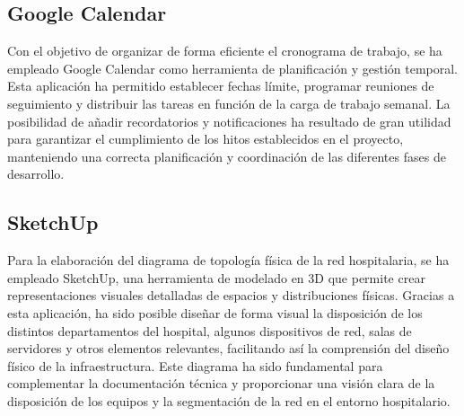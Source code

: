 \subsection{Google Calendar}
Con el objetivo de organizar de forma eficiente el cronograma de trabajo, se ha empleado Google Calendar como herramienta de planificación y gestión temporal. Esta 
aplicación ha permitido establecer fechas límite, programar reuniones de seguimiento y distribuir las tareas en función de la carga de trabajo semanal. La posibilidad 
de añadir recordatorios y notificaciones ha resultado de gran utilidad para garantizar el cumplimiento de los hitos establecidos en el proyecto, manteniendo una correcta 
planificación y coordinación de las diferentes fases de desarrollo.

\subsection{SketchUp}
Para la elaboración del diagrama de topología física de la red hospitalaria, se ha empleado SketchUp, una herramienta de modelado en 3D que permite crear representaciones 
visuales detalladas de espacios y distribuciones físicas.
Gracias a esta aplicación, ha sido posible diseñar de forma visual la disposición de los distintos departamentos del hospital, algunos dispositivos de red, salas de servidores
y otros elementos relevantes, facilitando así la comprensión del diseño físico de la infraestructura. Este diagrama ha sido fundamental para complementar la documentación técnica y 
proporcionar una visión clara de la disposición de los equipos y la segmentación de la red en el entorno hospitalario.